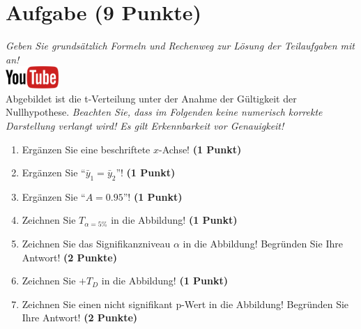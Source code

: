 \documentclass[a4paper, 9pt]{scrartcl}\usepackage[]{graphicx}\usepackage[]{xcolor}
\begin{document}
\section{Aufgabe \hfill (9 Punkte)}

\textit{Geben Sie grunds{\"a}tzlich Formeln und Rechenweg zur L{\"o}sung der
  Teilaufgaben mit an!} \\[1Ex]

\hfill\href{https://youtu.be/32JjH1eyuTU}{\includegraphics[width =
  2cm]{img/youtube}}\\[1Ex]



Abgebildet ist die t-Verteilung unter der Anahme der G{\"u}ltigkeit der
Nullhypothese. \textit{Beachten Sie, dass im Folgenden keine
  numerisch korrekte Darstellung verlangt wird! Es gilt Erkennbarkeit vor
  Genauigkeit!}

\begin{enumerate}
\item Erg{\"a}nzen Sie eine beschriftete $x$-Achse! \textbf{(1 Punkt)}
\item Erg{\"a}nzen Sie "`$\bar{y}_1 = \bar{y}_2$"'! \textbf{(1 Punkt)} 
\item Erg{\"a}nzen Sie "`$A = 0.95$"'! \textbf{(1 Punkt)}
\item Zeichnen Sie $T_{\alpha=5\%}$ in die Abbildung! \textbf{(1 Punkt)} 
\item Zeichnen Sie das Signifikanzniveau $\alpha$ in die Abbildung! Begr{\"u}nden
  Sie Ihre Antwort! \textbf{(2 Punkte)} 
\item Zeichnen Sie $+T_{D}$ in die Abbildung! \textbf{(1
    Punkt)}
\item Zeichnen Sie einen nicht signifikant p-Wert in die Abbildung! Begr{\"u}nden
  Sie Ihre Antwort! \textbf{(2 Punkte)}   
\end{enumerate}
\end{document}
